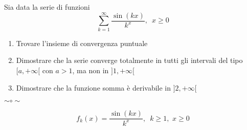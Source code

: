 \begin{exbar}
\begin{example}
	Sia data la serie di funzioni
	\begin{equation*}
		\sum_{k=1}^{\infty}\frac{\sin(kx)}{k^x},\,\,\, x \geq 0
	\end{equation*}
	
	\begin{enumerate}
		\item Trovare l'insieme di convergenza puntuale
		\item Dimostrare che la serie converge totalmente in tutti gli intervali del tipo $[a,+\infty[$ con $a > 1$, ma non in $]1,+\infty[$
		\item Dimostrare che la funzione somma è derivabile in $]2,+\infty[$
	\end{enumerate}
	
	\begin{center} $\sim \circ \sim $ \end{center}
	 
	\begin{equation*}
		f_k(x)=\frac{\sin(kx)}{k^x},\,\,\, k \geq 1, \,\, x \geq 0
	\end{equation*}
	
	

\end{example}
\end{exbar}

